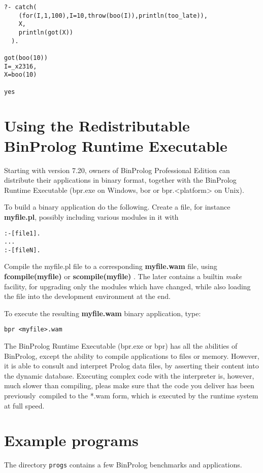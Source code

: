 \documentclass{article}
\begin{document}
\begin{verbatim}
?- catch(
    (for(I,1,100),I=10,throw(boo(I)),println(too_late)),
    X,
    println(got(X))
  ).

got(boo(10))
I=_x2316,
X=boo(10)

yes
\end{verbatim}


\section{Using the Redistributable BinProlog Runtime Executable}
Starting with version 7.20, owners of BinProlog Professional
Edition can distribute their applications in binary format,
together with the BinProlog Runtime Executable (bpr.exe on
Windows, bor or bpr.<platform> on Unix).

To build a binary application do the following. Create
a file, for instance {\bf myfile.pl}, possibly including 
various modules in it with
\begin{verbatim}
:-[file1].
...
:-[fileN].
\end{verbatim}

Compile the myfile.pl file to a corresponding {\bf myfile.wam} file, 
using {\bf fcompile(myfile)} or {\bf scompile(myfile)} . 
The later contains a builtin {\em make} facility, 
for upgrading only the modules which have changed, 
while also loading the file into the development environment 
at the end.

To execute the resulting {\bf myfile.wam} binary application,
type:

\begin{verbatim}
bpr <myfile>.wam
\end{verbatim}

The BinProlog Runtime Executable (bpr.exe or bpr) has all
the abilities of BinProlog, except the ability to compile
applications to files or memory. However, it is able to
consult and interpret Prolog data files, by asserting their
content into the dynamic database. Executing complex code
with the interpreter is, however, much slower than compiling,
pleas make sure that the code you deliver has been previously\
compiled to the *.wam form, which is executed by the runtime
system at full speed.


\section{Example programs}
The directory {\tt progs} contains a few BinProlog benchmarks and applications.
\end{document}
